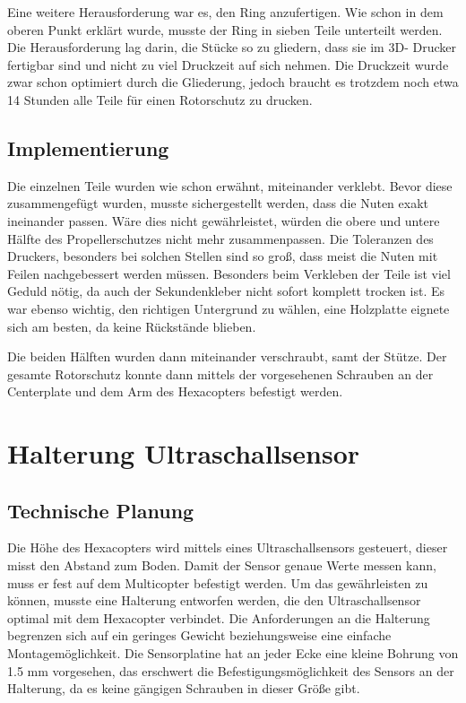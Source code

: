	Eine weitere Herausforderung war es, den Ring anzufertigen. Wie schon in dem oberen Punkt erklärt wurde, musste der Ring in sieben Teile unterteilt werden.
	Die Herausforderung lag darin, die Stücke so zu gliedern, dass sie im 3D- Drucker fertigbar sind und nicht zu viel Druckzeit auf sich nehmen.
	Die Druckzeit wurde zwar schon optimiert durch die Gliederung, jedoch braucht es trotzdem noch etwa 14 Stunden alle Teile für einen Rotorschutz zu drucken.

	\subsection{Implementierung}

Die einzelnen Teile wurden wie schon erwähnt, miteinander verklebt. Bevor diese zusammengefügt wurden, musste sichergestellt werden, dass die Nuten exakt ineinander passen.
Wäre dies nicht gewährleistet, würden die obere und untere Hälfte des Propellerschutzes nicht mehr zusammenpassen.
Die Toleranzen des Druckers, besonders bei solchen Stellen sind so groß, dass meist die Nuten mit Feilen nachgebessert werden müssen.
Besonders beim Verkleben der Teile ist viel Geduld nötig, da auch der Sekundenkleber nicht sofort komplett trocken ist.
Es war ebenso wichtig, den richtigen Untergrund zu wählen, eine Holzplatte eignete sich am besten, da keine Rückstände blieben.

Die beiden Hälften wurden dann miteinander verschraubt, samt der Stütze.
Der gesamte Rotorschutz konnte dann mittels der vorgesehenen Schrauben an der Centerplate und dem Arm des Hexacopters befestigt werden.

			\newpage

\section{Halterung Ultraschallsensor}

	\subsection{Technische Planung}

	Die Höhe des Hexacopters wird mittels eines Ultraschallsensors gesteuert, dieser misst den Abstand zum Boden.
	Damit der Sensor genaue Werte messen kann, muss er fest auf dem Multicopter befestigt werden.
	Um das gewährleisten zu können, musste eine Halterung entworfen werden, die den Ultraschallsensor optimal mit dem Hexacopter verbindet.
	Die Anforderungen an die Halterung begrenzen sich auf ein geringes Gewicht beziehungsweise eine einfache Montagemöglichkeit.
	Die Sensorplatine hat an jeder Ecke eine kleine Bohrung von 1.5 mm vorgesehen, das erschwert die Befestigungsmöglichkeit des Sensors an der Halterung, da es keine gängigen Schrauben in dieser Größe gibt.

